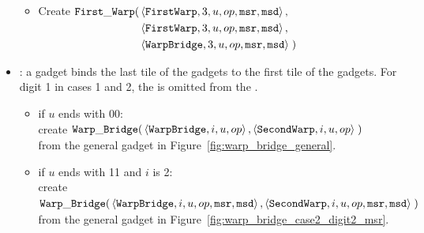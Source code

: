 \begin{itemize}
\begin{itemize}
                \item Create
                $\begin{aligned}[t]
                    {\tt First\_Warp}(& \left\langle {\tt FirstWarp},  3, u, op, {\tt msr}, {\tt msd} \right\rangle,\\
                               & \left\langle {\tt FirstWarp},  3, u, op, {\tt msr}, {\tt msd} \right\rangle,\\
                               & \left\langle {\tt WarpBridge}, 3, u, op, {\tt msr}, {\tt msd} \right\rangle \;)
                \end{aligned}$
                \vspace{.5cm}

            \end{itemize}
        \vspace{.5cm}

        \item {\warpbridge}: a {\warpbridge} gadget binds the last tile of the {\firstwarp} gadgets to the
             first tile of the {\secondwarp} gadgets. For digit 1 in cases 1 and 2, the
             {\warpbridge} is omitted from the {\warpunit}.

        \begin{itemize}

            \item if $u$ ends with 00:\\
            create
            $\begin{aligned}[t]
                {\tt Warp\_Bridge}(& \left\langle {\tt WarpBridge}, i, u, op \right\rangle,
                              \left\langle {\tt SecondWarp}, i, u, op \right\rangle \;)
            \end{aligned}$ \\ from the general gadget in Figure~\ref{fig:warp_bridge_general}.
            \vspace{.5cm}

            \item if $u$ ends with 11 and $i$ is 2: \\
            create
            $\begin{aligned}[t]
                {\tt Warp\_Bridge}(& \left\langle {\tt WarpBridge}, i, u, op, {\tt msr}, {\tt msd} \right\rangle,
                              \left\langle {\tt SecondWarp}, i, u, op, {\tt msr}, {\tt msd} \right\rangle \;)
            \end{aligned}$ \\ from the general gadget in Figure~\ref{fig:warp_bridge_case2_digit2_msr}.
            \vspace{.5cm}


\end{itemize}
\end{itemize}
